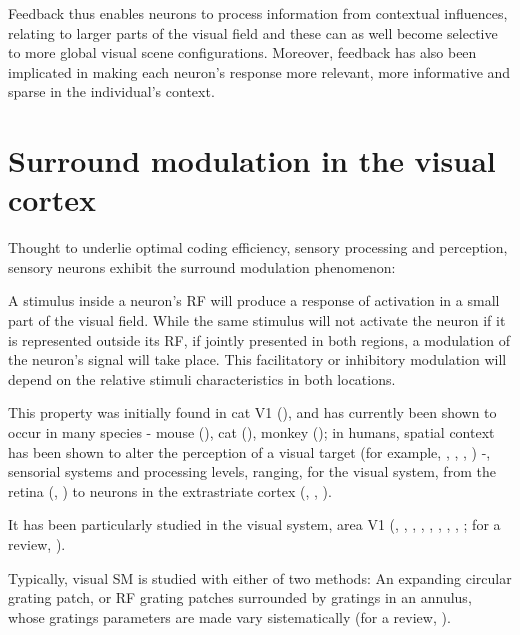 Feedback thus enables neurons to process information from contextual influences, relating to larger parts of the visual field and these can as well become selective to more global visual scene configurations. Moreover, feedback has also been implicated in making each neuron's response more relevant, more informative and sparse in the individual's context.



\section{Surround modulation in the visual cortex}

Thought to underlie optimal coding efficiency, sensory processing and perception, sensory neurons exhibit the surround modulation phenomenon: 

A stimulus inside a neuron's RF will produce a response of activation in a small part of the visual field. While the same stimulus will not activate the neuron if it is represented outside its RF, if jointly presented in both regions, a modulation of the neuron's signal will take place. This facilitatory or inhibitory modulation will depend on the relative stimuli characteristics in both locations. 

This property was initially found in cat V1 (\cite{Hubel1965}), and has currently been shown to occur in many species - mouse (\cite{Bergh2010}), cat (\cite{Blakemore1972}), monkey (\cite{Cavanaugh2002a}); in humans, spatial context has been shown to alter the perception of a visual target (for example, \cite{Chubb1989}, \cite{Cannon1991}, \cite{Meese2004}, \cite{Nurminen2009}) -, sensorial systems and processing levels, ranging, for the visual system, from the retina (\cite{McIlwain1964}, \cite{Solomon2006}) to neurons in the extrastriate cortex (\cite{Allman1985}, \cite{Desimone1987}, \cite{Born2005}). 

It has been particularly studied in the visual system, area V1 (\cite{Hubel1965}, \cite{Blakemore1972}, \cite{Maffei1976}, \cite{Gilbert1977}, \cite{Nelson1978}, \cite{Sceniak2001}, \cite{Cavanaugh2002a}, \cite{Bergh2010}, \cite{Angelucci2013}; for a review, \cite{Angelucci2017}).

Typically, visual SM is studied with either of two methods: An expanding circular grating patch, or RF grating patches surrounded by gratings in an annulus, whose gratings parameters are made vary sistematically (for a review, \cite{Angelucci2014}).

